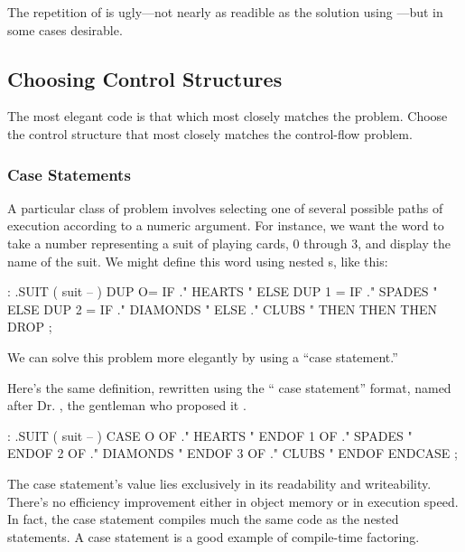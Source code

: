 The repetition of  is ugly---not nearly as readible as the
solution using ---but in some cases desirable.%
%

\subsection{Choosing Control Structures}%
\begin{tip}
The most elegant code is that which most closely matches the problem.
Choose the control structure that most closely matches the control-flow
problem.
\end{tip}%

\subsubsection{Case Statements}%
%

A particular class of problem involves selecting one of several possible
paths of execution according to a numeric argument. For instance, we
want the word  to take a number representing a suit of playing
cards, 0 through 3, and display the name of the suit. We might define this
word using nested s, like this:

\begin{Code}
: .SUIT ( suit -- )
  DUP  O=  IF ." HEARTS "   ELSE
  DUP  1 = IF ." SPADES "   ELSE
  DUP  2 = IF ." DIAMONDS " ELSE
              ." CLUBS "
  THEN THEN THEN  DROP ;
\end{Code}
We can solve this problem more elegantly by using a ``case statement.''

Here's the same definition, rewritten using the `` case statement''
format, named after Dr. , the gentleman who proposed
it \cite{eaker}.

\begin{Code}
: .SUIT ( suit -- )
  CASE
  O OF   ." HEARTS "    ENDOF
  1 OF   ." SPADES "    ENDOF
  2 OF   ." DIAMONDS "  ENDOF
  3 OF   ." CLUBS "     ENDOF     ENDCASE ;
\end{Code}
The case statement's value lies exclusively in its readability and
writeability. There's no efficiency improvement either in object memory
or in execution speed. In fact, the case statement compiles much the
same code as the nested  statements. A case statement is a
good example of compile-time factoring.

